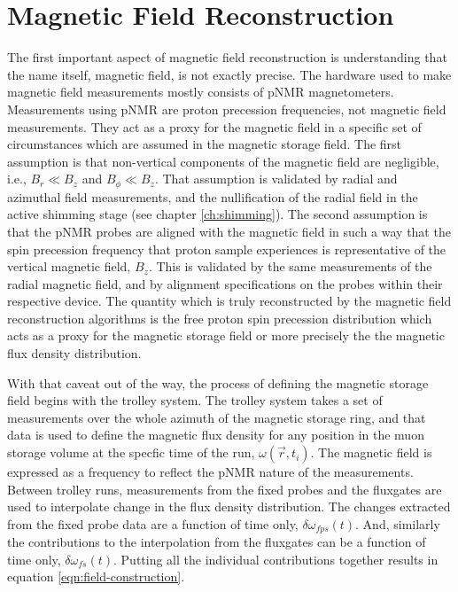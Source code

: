 \section{Magnetic Field Reconstruction}
The first important aspect of magnetic field reconstruction is understanding that the name itself, magnetic field, is not exactly precise.  The hardware used to make magnetic field measurements mostly consists of pNMR magnetometers.  Measurements using pNMR are proton precession frequencies, not magnetic field measurements.  They act as a proxy for the magnetic field in a specific set of circumstances which are assumed in the \mugmtwo magnetic storage field.  The first assumption is that non-vertical components of the magnetic field are negligible, i.e., $B_r \ll B_z$ and $B_\phi \ll B_z$.  That assumption is validated by radial and azimuthal field measurements, and the nullification of the radial field in the active shimming stage (see chapter \ref{ch:shimming}).  The second assumption is that the pNMR probes are aligned with the magnetic field in such a way that the spin precession frequency that proton sample experiences is representative of the vertical magnetic field, $B_z$.  This is validated by the same measurements of the radial magnetic field, and by alignment specifications on the probes within their respective device.  The quantity which is truly reconstructed by the magnetic field reconstruction algorithms is the free proton spin precession distribution which acts as a proxy for the magnetic storage field or more precisely the the magnetic flux density distribution.

With that caveat out of the way, the process of defining the \gmtwo magnetic storage field begins with the trolley system.  The trolley system takes a set of measurements over the whole azimuth of the magnetic storage ring, and that data is used to define the magnetic flux density for any position in the muon storage volume at the specfic time of the run, $\omega(\vec{r}, t_i)$. The magnetic field is expressed as a frequency to reflect the pNMR nature of the measurements.  Between trolley runs, measurements from the fixed probes and the fluxgates are used to interpolate change in the flux density distribution.  The changes extracted from the fixed probe data are a function of time only, $\delta \omega_{fps}(t)$.  And, similarly the contributions to the interpolation from the fluxgates can be a function of time only, $\delta \omega_{fs}(t)$.  Putting all the individual contributions together results in equation \ref{eqn:field-construction}.

